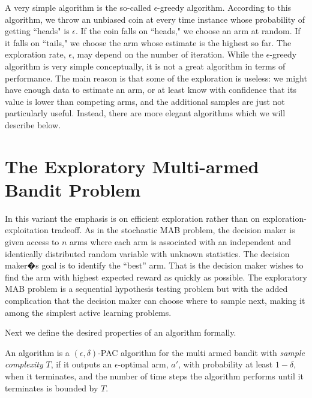 A very simple algorithm is the so-called $\epsilon$-greedy algorithm. According to this algorithm, we throw an unbiased coin at every time instance whose probability of getting ``heads" is $\epsilon$.
If the coin falls on ``heads," we choose an arm at random. If it falls on ``tails," we choose the arm whose estimate is the highest so far. The exploration rate, $\epsilon$, may depend on the number of iteration. While the $\epsilon$-greedy algorithm is very simple conceptually, it is not a great algorithm in terms of performance. The main reason is that some of the exploration is useless: we might have enough data to estimate an arm, or at least know with confidence that its value is lower than competing arms, and the additional samples are just not particularly useful.
Instead, there are more elegant algorithms which we will describe below.





\section{The Exploratory Multi-armed Bandit Problem}

In this variant the emphasis is on efficient exploration rather than on exploration-exploitation tradeoff. As in the stochastic MAB problem, the decision maker is given access to $n$ arms where each arm is associated with an independent and identically distributed random variable with unknown statistics. The decision maker�s goal is to identify the ``best'' arm. That is the decision maker wishes to find the arm with highest expected reward as quickly as possible.
The exploratory MAB problem is a sequential hypothesis testing problem but with the added complication that the decision maker can choose where to sample next, making it among the simplest active learning problems.


Next we define the desired properties of an algorithm formally.
\begin{definition}
An algorithm is a $(\epsilon,\delta)$-PAC algorithm for the multi
armed bandit with {\em sample complexity} $T$, if it outputs an
$\epsilon$-optimal arm, $a'$, with probability at least
$1-\delta$, when it terminates, and the number of time steps the
algorithm performs until it terminates is bounded by $T$.
\end{definition}


